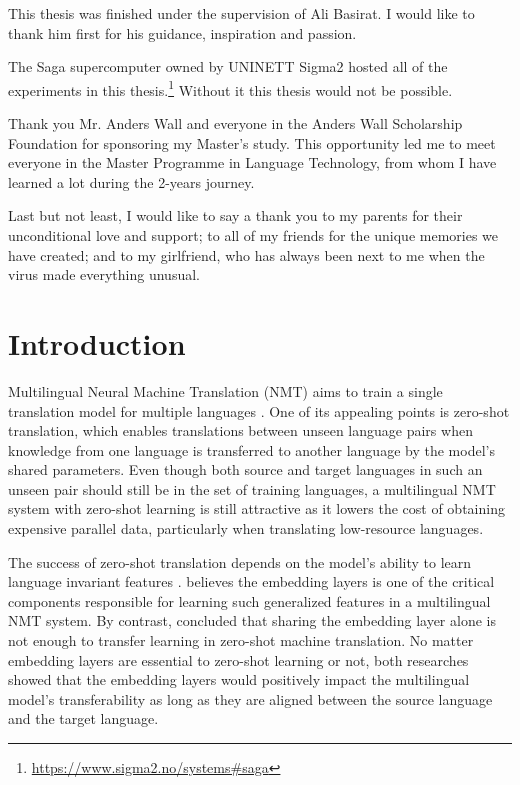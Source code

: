 \documentclass[thesis,fonts=libertine]{cluu}
\begin{document}
\tableofcontents


This thesis was finished under the supervision of Ali Basirat. I would like 
to thank him first for his guidance, inspiration and passion.

The Saga supercomputer owned by UNINETT Sigma2 hosted all of the experiments in this thesis.\footnote{\url{https://www.sigma2.no/systems\#saga}} Without it this thesis would not be possible.

Thank you Mr. Anders Wall and everyone in the Anders Wall Scholarship Foundation for sponsoring my Master's study. This opportunity led me to meet everyone in the Master Programme in Language Technology, from whom I have learned a lot during the 2-years journey.

Last but not least, I would like to say a thank you to my parents for their unconditional love and support; to all of my friends for the unique memories we have created; and to my girlfriend, who has always been next to me when the virus made everything unusual.


\chapter{Introduction}

Multilingual Neural Machine Translation (NMT) aims to train a single translation model for multiple languages \parencite{Johnson:2016aa,aharoni-etal-2019-massively}. One of its appealing points is zero-shot translation, which enables translations between unseen language pairs when knowledge from one language is transferred to another language by the model's shared parameters. Even though both source and target languages in such an unseen pair should still be in the set of training languages, a multilingual NMT system with zero-shot learning is still attractive as it lowers the cost of obtaining expensive parallel data, particularly when translating low-resource languages.

The success of zero-shot translation depends on the model's ability to learn language invariant features \parencite{Arivazhagan:2019aa}. \textcite{Kim:2019aa} believes the embedding layers is one of the critical components responsible for learning such generalized features in a multilingual NMT system. By contrast, \textcite{aji-etal-2020-neural} concluded that sharing the embedding layer alone is not enough to transfer learning in zero-shot machine translation. No matter embedding layers are essential to zero-shot learning or not, both researches showed that the embedding layers would positively impact the multilingual model's transferability as long as they are aligned between the source language and the target language.
\end{document}
